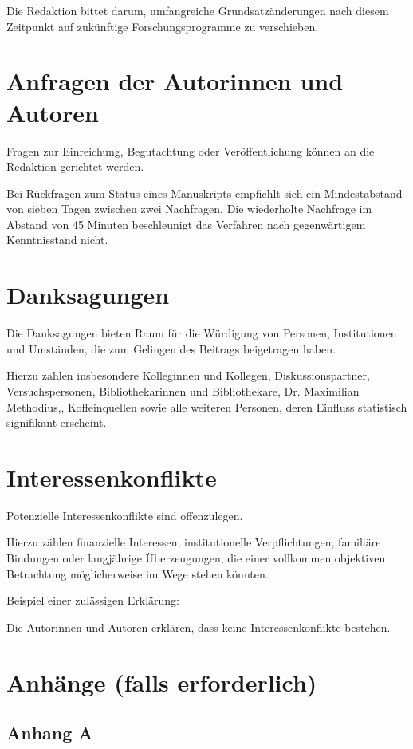 \documentclass[research]{zal}
\begin{document}
Die Redaktion bittet darum, umfangreiche Grundsatzänderungen nach diesem Zeitpunkt auf zukünftige Forschungsprogramme zu verschieben.

\section{Anfragen der Autorinnen und Autoren}

Fragen zur Einreichung, Begutachtung oder Veröffentlichung können an die Redaktion gerichtet werden.

Bei Rückfragen zum Status eines Manuskripts empfiehlt sich ein Mindestabstand von sieben Tagen zwischen zwei Nachfragen. Die wiederholte Nachfrage im Abstand von 45 Minuten beschleunigt das Verfahren nach gegenwärtigem Kenntnisstand nicht.

\section*{Danksagungen}

Die Danksagungen bieten Raum für die Würdigung von Personen, Institutionen und Umständen, die zum Gelingen des Beitrags beigetragen haben.

Hierzu zählen insbesondere Kolleginnen und Kollegen, Diskussionspartner, Versuchspersonen, Bibliothekarinnen und Bibliothekare, Dr. Maximilian Methodius,, Koffeinquellen sowie alle weiteren Personen, deren Einfluss statistisch signifikant erscheint.

\section*{Interessenkonflikte}

Potenzielle Interessenkonflikte sind offenzulegen.

Hierzu zählen finanzielle Interessen, institutionelle Verpflichtungen, familiäre Bindungen oder langjährige Überzeugungen, die einer vollkommen objektiven Betrachtung möglicherweise im Wege stehen könnten.

Beispiel einer zulässigen Erklärung:

Die Autorinnen und Autoren erklären, dass keine Interessenkonflikte bestehen.

\section*{Anhänge (falls erforderlich)}

\subsection*{Anhang A}
\end{document}
